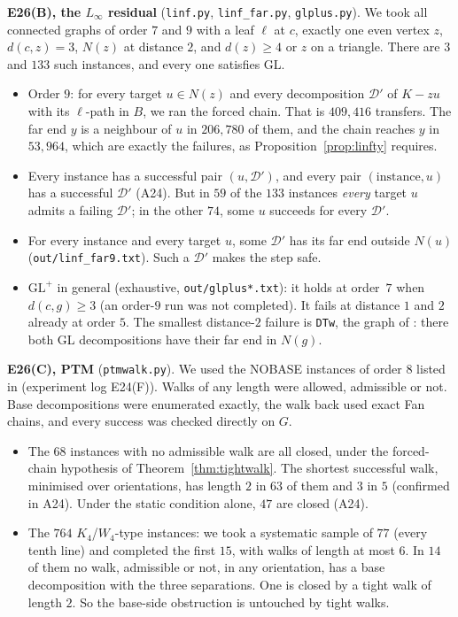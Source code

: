 \documentclass[11pt]{amsart}
\theoremstyle{definition}
\newcommand{\cD}{\mathcal D}
\begin{document}
\textbf{E26(B), the $L_\infty$ residual} (\texttt{linf.py}, \texttt{linf\_far.py}, \texttt{glplus.py}).
We took all connected graphs of order $7$ and $9$ with a leaf $\ell$ at $c$, exactly one even vertex
$z$, $d(c,z)=3$, $N(z)$ at distance $2$, and $d(z)\ge4$ or $z$ on a triangle. There are $3$ and $133$
such instances, and every one satisfies GL.
\begin{itemize}
\item Order $9$: for every target $u\in N(z)$ and every decomposition $\cD'$ of $K-zu$ with its
$\ell$-path in $B$, we ran the forced chain. That is $409{,}416$ transfers. The far end $y$ is a
neighbour of $u$ in $206{,}780$ of them, and the chain reaches $y$ in $53{,}964$, which are exactly
the failures, as Proposition~\ref{prop:linfty} requires.
\item Every instance has a successful pair $(u,\cD')$, and every pair $(\text{instance},u)$ has a
successful $\cD'$ (A24). But in $59$ of the $133$ instances \emph{every} target $u$ admits a failing
$\cD'$; in the other $74$, some $u$ succeeds for every $\cD'$.
\item For every instance and every target $u$, some $\cD'$ has its far end outside $N(u)$
(\texttt{out/linf\_far9.txt}). Such a $\cD'$ makes the step safe.
\item $\mathrm{GL}^+$ in general (exhaustive, \texttt{out/glplus*.txt}): it holds at order~$7$ when
$d(c,g)\ge3$ (an order-$9$ run was not completed). It fails at distance $1$ and $2$ already at order $5$. The smallest distance-$2$
failure is \texttt{DTw}, the graph of \cite[Example~3.5]{L1S}: there both GL decompositions have their
far end in $N(g)$.
\end{itemize}

\textbf{E26(C), PTM} (\texttt{ptmwalk.py}). We used the NOBASE instances of order $8$ listed in
\cite[\S8]{TM} (experiment log E24(F)). Walks of any length were allowed, admissible or not. Base
decompositions were enumerated exactly, the walk back used exact Fan chains, and every success was
checked directly on $G$.
\begin{itemize}
\item The $68$ instances with no admissible walk are all closed, under the forced-chain hypothesis of
Theorem~\ref{thm:tightwalk}. The shortest successful walk, minimised over orientations, has length
$2$ in $63$ of them and $3$ in $5$ (confirmed in A24). Under the static condition alone, $47$ are
closed (A24).
\item The $764$ $K_4$/$W_4$-type instances: we took a systematic sample of $77$ (every tenth line) and
completed the first $15$, with walks of length at most $6$. In $14$ of them no walk, admissible or
not, in any orientation, has a base decomposition with the three separations. One is closed by a
tight walk of length $2$. So the base-side obstruction is untouched by tight walks.
\end{itemize}
\end{document}
